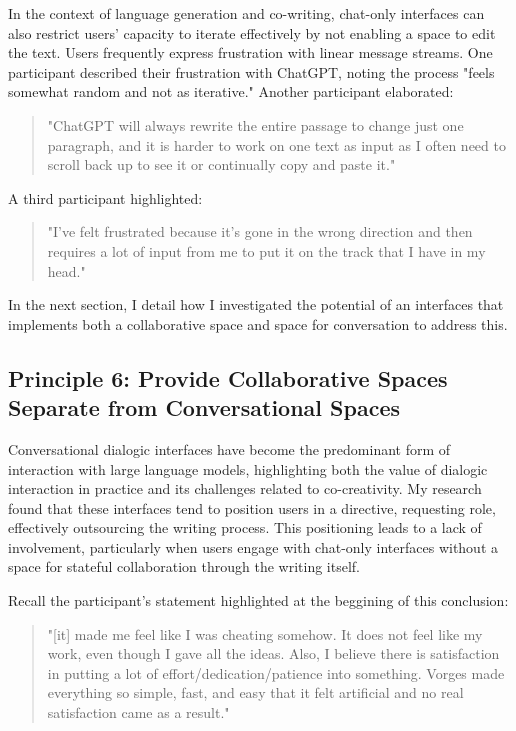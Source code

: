 In the context of language generation and co-writing, chat-only interfaces can also restrict users' capacity to iterate effectively by not enabling a space to edit the text. Users frequently express frustration with linear message streams. One participant described their frustration with ChatGPT, noting the process "feels somewhat random and not as iterative." Another participant elaborated:

\begin{quote}
"ChatGPT will always rewrite the entire passage to change just one paragraph, and it is harder to work on one text as input as I often need to scroll back up to see it or continually copy and paste it."
\end{quote}

A third participant highlighted:

\begin{quote}
"I've felt frustrated because it's gone in the wrong direction and then requires a lot of input from me to put it on the track that I have in my head."
\end{quote}


In the next section, I detail how I investigated the potential of an interfaces that implements both a collaborative space and space for conversation to address this. 

\subsection{Principle 6: Provide Collaborative Spaces Separate from Conversational Spaces}

Conversational dialogic interfaces have become the predominant form of interaction with large language models, highlighting both the value of dialogic interaction in practice and its challenges related to co-creativity. My research found that these interfaces tend to position users in a directive, requesting role, effectively outsourcing the writing process. This positioning leads to a lack of involvement, particularly when users engage with chat-only interfaces without a space for stateful collaboration through the writing itself.

Recall the participant's statement highlighted at the beggining of this conclusion:

\begin{quote}
"[it] made me feel like I was cheating somehow. It does not feel like my work, even though I gave all the ideas. Also, I believe there is satisfaction in putting a lot of effort/dedication/patience into something. Vorges made everything so simple, fast, and easy that it felt artificial and no real satisfaction came as a result."
\end{quote}

